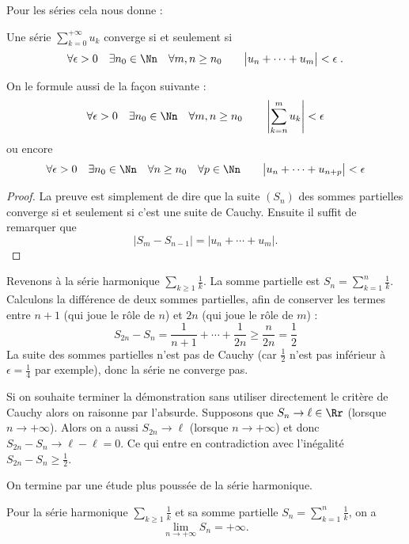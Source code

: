 \documentclass[class=report,crop=false]{standalone}
\begin{document}
Pour les séries cela nous donne : 
\begin{theoreme}
\label{th:cauchyserie}
Une série  $\displaystyle\sum_{k=0}^{+\infty} u_k$ converge si et seulement si  
$$\forall \epsilon>0 \quad \exists n_0\in\Nn \quad \forall m,n\ge n_0 \qquad \big|u_{n}+\cdots +u_m\big| < \epsilon \; .$$
\end{theoreme}
On le formule aussi de la façon suivante :
$$ \forall \epsilon>0 \quad \exists n_0\in\Nn \quad
\forall m,n \ge n_0 \qquad  \left| \sum_{k=n}^m u_k\right| <\epsilon$$
ou encore
$$ \forall \epsilon>0 \quad \exists n_0\in\Nn \quad
\forall n\ge n_0 \quad \forall p\in\Nn 
\qquad  \big|u_{n}+\cdots +u_{n+p}\big|<\epsilon$$



\begin{proof}
La preuve est simplement de dire que la suite $(S_n)$ des sommes partielles converge si
et seulement si c'est une suite de Cauchy. Ensuite il suffit de remarquer que 
$$\big|S_m-S_{n-1}\big|= \big|u_{n}+\cdots +u_m\big|.$$
\end{proof}



Revenons à la série harmonique $\sum_{k \ge 1} \frac{1}{k}$.
La somme partielle est $S_n = \sum_{k=1}^{n} \frac{1}{k}$.
Calculons la différence de deux sommes partielles, afin de conserver 
les termes entre $n+1$ (qui joue le rôle de $n$)
et $2n$ (qui joue le rôle de $m$) :
$$
S_{2n}-S_{n} = \frac{1}{n+1}+\cdots+\frac{1}{2n}\ge
\frac{n}{2n}=\frac{1}{2} 
$$
La suite des sommes partielles n'est pas de Cauchy (car $\frac12$ 
n'est pas inférieur à $\epsilon = \frac14$ par exemple), 
donc la série ne converge pas.


Si on souhaite terminer la démonstration sans utiliser directement le critère de Cauchy alors on raisonne par l'absurde. Supposons que $S_n \to \ell \in \Rr$ (lorsque $n \to +\infty$).
Alors on a aussi $S_{2n} \to \ell$ (lorsque $n \to +\infty$) et donc 
$S_{2n}-S_{n}  \to \ell - \ell = 0$. Ce qui entre en contradiction avec l'inégalité
$S_{2n}-S_{n} \ge \frac{1}{2}$.

\bigskip


On termine par une étude plus poussée de la série harmonique.

\begin{proposition}
Pour la série harmonique $\displaystyle \sum_{k \ge 1} \frac{1}{k}$  
et sa somme partielle
$\displaystyle S_n = \sum_{k = 1}^n \frac{1}{k}$, on a 
$$\lim_{n\to+\infty} S_n=+\infty.$$
\end{proposition}
\end{document}
